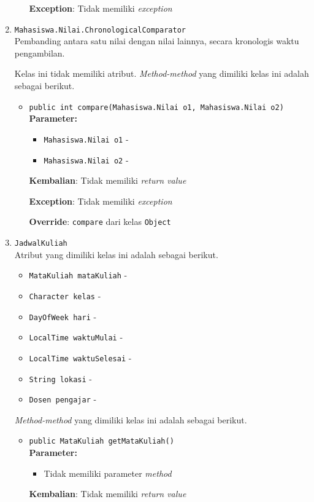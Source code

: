\documentclass{article}
\begin{document}
\begin{enumerate}
\begin{itemize}
\textbf{Exception}: Tidak memiliki \textit{exception}

\end{itemize}
\item \texttt{Mahasiswa.Nilai.ChronologicalComparator}\\ 
Pembanding antara satu nilai dengan nilai lainnya, secara
 kronologis waktu pengambilan.

Kelas ini tidak memiliki atribut. \textit{Method-method} yang dimiliki kelas ini adalah sebagai berikut.
\begin{itemize}
\item \texttt{public int compare(Mahasiswa.Nilai o1, Mahasiswa.Nilai o2)}\\ 


\textbf{Parameter:}\begin{itemize}
\item \texttt{Mahasiswa.Nilai o1} - 
\item \texttt{Mahasiswa.Nilai o2} - 
\end{itemize}
\textbf{Kembalian}: Tidak memiliki \textit{return value}

\textbf{Exception}: Tidak memiliki \textit{exception}

\textbf{Override}: \texttt{compare} dari kelas \texttt{Object}

\end{itemize}
\item \texttt{JadwalKuliah}\\ 
Atribut yang dimiliki kelas ini adalah sebagai berikut.
\begin{itemize}
\item \texttt{MataKuliah mataKuliah} - 
\item \texttt{Character kelas} - 
\item \texttt{DayOfWeek hari} - 
\item \texttt{LocalTime waktuMulai} - 
\item \texttt{LocalTime waktuSelesai} - 
\item \texttt{String lokasi} - 
\item \texttt{Dosen pengajar} - 
\end{itemize}
\textit{Method-method} yang dimiliki kelas ini adalah sebagai berikut.
\begin{itemize}
\item \texttt{public MataKuliah getMataKuliah()}\\ 


\textbf{Parameter:}\begin{itemize}
\item Tidak memiliki parameter \textit{method}
\end{itemize}
\textbf{Kembalian}: Tidak memiliki \textit{return value}


\end{itemize}
\end{enumerate}
\end{document}
